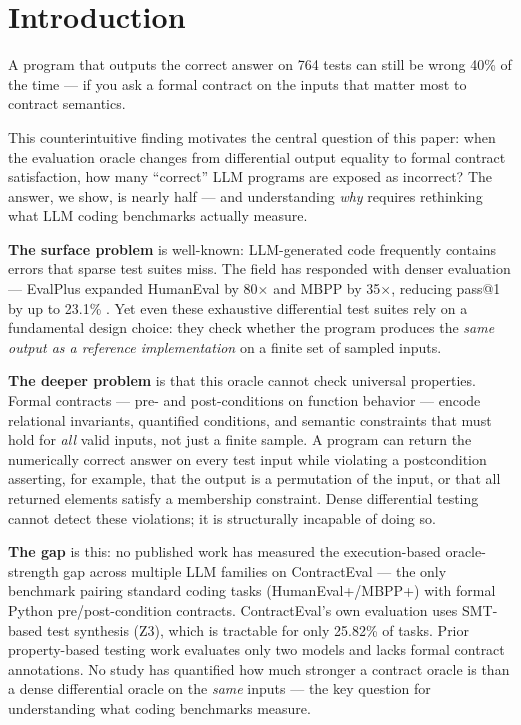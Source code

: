 \section{Introduction}

A program that outputs the correct answer on 764 tests can still be wrong 40\% of the time --- if you ask a formal contract on the inputs that matter most to contract semantics.

This counterintuitive finding motivates the central question of this paper: when the evaluation oracle changes from differential output equality to formal contract satisfaction, how many ``correct'' LLM programs are exposed as incorrect? The answer, we show, is nearly half --- and understanding \emph{why} requires rethinking what LLM coding benchmarks actually measure.

\textbf{The surface problem} is well-known: LLM-generated code frequently contains errors that sparse test suites miss. The field has responded with denser evaluation --- EvalPlus expanded HumanEval by 80$\times$ and MBPP by 35$\times$, reducing pass@1 by up to 23.1\% \citep{Liu2023EvalPlus}. Yet even these exhaustive differential test suites rely on a fundamental design choice: they check whether the program produces the \emph{same output as a reference implementation} on a finite set of sampled inputs.

\textbf{The deeper problem} is that this oracle cannot check universal properties. Formal contracts --- pre- and post-conditions on function behavior --- encode relational invariants, quantified conditions, and semantic constraints that must hold for \emph{all} valid inputs, not just a finite sample. A program can return the numerically correct answer on every test input while violating a postcondition asserting, for example, that the output is a permutation of the input, or that all returned elements satisfy a membership constraint. Dense differential testing cannot detect these violations; it is structurally incapable of doing so.

\textbf{The gap} is this: no published work has measured the execution-based oracle-strength gap across multiple LLM families on ContractEval \citep{Lim2025ContractEval} --- the only benchmark pairing standard coding tasks (HumanEval+/MBPP+) with formal Python pre/post-condition contracts. ContractEval's own evaluation \citep{Lim2025ContractEval} uses SMT-based test synthesis (Z3), which is tractable for only 25.82\% of tasks. Prior property-based testing work \citep{Bose2025Prompts} evaluates only two models and lacks formal contract annotations. No study has quantified how much stronger a contract oracle is than a dense differential oracle on the \emph{same} inputs --- the key question for understanding what coding benchmarks measure.

